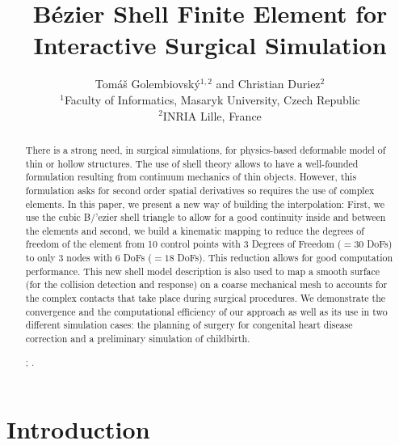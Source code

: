 \documentclass{egpubl}
\title[B\'ezier Shell FE]%
      {B\'ezier Shell Finite Element for Interactive Surgical Simulation}
\author[T. Golembiovský \& C. Duriez]
       {Tomáš Golembiovský$^{1,2}$ and Christian Duriez$^{2}$\\
        $^1$Faculty of Informatics, Masaryk University, Czech Republic\\
        $^2$INRIA Lille, France
       } %
\begin{document}

\maketitle

\begin{abstract} %
There is a strong need, in surgical simulations, for physics-based deformable model of thin or hollow structures.
The use of shell theory allows to have a well-founded formulation resulting from continuum mechanics of thin objects.
However, this formulation asks for second order spatial derivatives so requires the use of complex elements.
In this paper, we present a new way of building the interpolation:
First, we use the cubic B/'ezier shell triangle to allow for a good continuity inside and between the elements and second, we build a kinematic mapping to reduce the degrees of freedom of the element from 10 control points with 3 Degrees of Freedom ($=30$ DoFs) to only 3 nodes with 6 DoFs ($=18$ DoFs).
This reduction allows for good computation performance.
This new shell model description is also used to map a smooth surface (for the collision detection and response) on a coarse mechanical mesh to accounts for the complex contacts that take place during surgical procedures.
We demonstrate the convergence and the computational efficiency of our approach as well as its use in two different simulation cases: the planning of surgery for congenital heart disease correction and a preliminary simulation of childbirth.

\begin{classification} %
    ;
    .
\end{classification}

\end{abstract}






\section{Introduction} %
\end{document}
